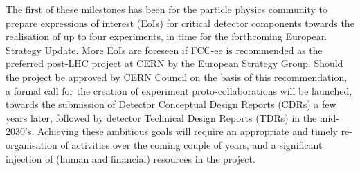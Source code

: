 The first of these milestones has been for the particle physics community to prepare expressions of interest (EoIs) for critical detector components towards the realisation of up to four experiments, in time for the forthcoming European Strategy Update. More EoIs are foreseen if FCC-ee is recommended as the preferred post-LHC project at CERN by the European Strategy Group. Should the project be approved by CERN Council on the basis of this recommendation, a formal call for the creation of experiment proto-collaborations will be launched, towards the submission of Detector Conceptual Design Reports (CDRs) a few years later, followed by detector Technical Design Reports (TDRs) in the mid-2030's. Achieving these ambitious goals will require an appropriate and timely re-organisation of activities over the coming couple of years, and a significant injection of (human and financial) resources in the project.


